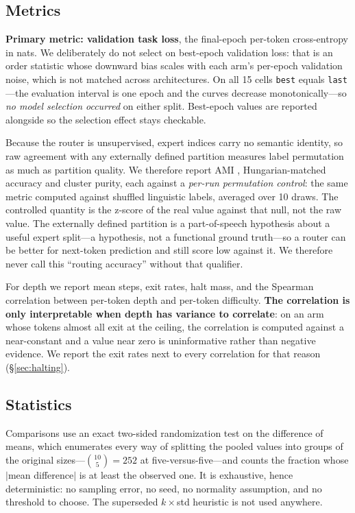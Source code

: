 \subsection{Metrics}
\label{sec:metrics}

\textbf{Primary metric: validation task loss}, the final-epoch per-token
cross-entropy in nats. We deliberately do not select on best-epoch validation loss:
that is an order statistic whose downward bias scales with each arm's per-epoch
validation noise, which is not matched across architectures. On all 15 cells
\texttt{best} equals \texttt{last}---the evaluation interval is one epoch and the
curves decrease monotonically---so \emph{no model selection occurred} on either
split. Best-epoch values are reported alongside so the selection effect stays
checkable.

Because the router is unsupervised, expert indices carry no semantic identity, so
raw agreement with any externally defined partition measures label permutation as
much as partition quality. We therefore report AMI \citep{vinh2010ami},
Hungarian-matched accuracy and cluster purity, each against a \emph{per-run
permutation control}: the same metric computed against shuffled linguistic labels,
averaged over 10 draws. The controlled quantity is the z-score of the real value
against that null, not the raw value. The externally defined partition is a
part-of-speech hypothesis about a useful expert split---a hypothesis, not a
functional ground truth---so a router can be better for next-token prediction and
still score low against it. We therefore never call this ``routing accuracy''
without that qualifier.

For depth we report mean steps, exit rates, halt mass, and the Spearman correlation
between per-token depth and per-token difficulty. \textbf{The correlation is only
interpretable when depth has variance to correlate}: on an arm whose tokens almost
all exit at the ceiling, the correlation is computed against a near-constant and a
value near zero is uninformative rather than negative evidence. We report the exit
rates next to every correlation for that reason (\S\ref{sec:halting}).

\subsection{Statistics}
\label{sec:stats}

Comparisons use an exact two-sided randomization test on the difference of means,
which enumerates every way of splitting the pooled values into groups of the
original sizes---$\binom{10}{5} = 252$ at five-versus-five---and counts the
fraction whose $|$mean difference$|$ is at least the observed one. It is
exhaustive, hence deterministic: no sampling error, no seed, no normality
assumption, and no threshold to choose. The superseded $k\times$std heuristic is
not used anywhere.

